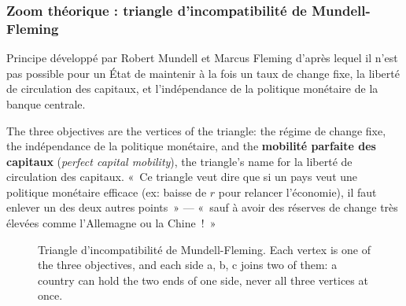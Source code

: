 \subsubsection{Zoom théorique : triangle d'incompatibilité de Mundell-Fleming}

\begin{definition}
  Principe développé par Robert Mundell et Marcus Fleming d'après lequel il n'est pas
  possible pour un État de maintenir à la fois un taux de change fixe, la liberté de
  circulation des capitaux, et l'indépendance de la politique monétaire de la banque
  centrale.
\end{definition}

The three objectives are the vertices of the triangle: the régime de change fixe, the
indépendance de la politique monétaire, and the \textbf{mobilité parfaite des capitaux}
(\textit{perfect capital mobility}), the triangle's name for la liberté de circulation
des capitaux. «~Ce triangle veut dire que si un pays veut une politique monétaire
efficace (ex: baisse de $r$ pour relancer l'économie), il faut enlever un des deux
autres points~» --- «~sauf à avoir des réserves de change très élevées comme
l'Allemagne ou la Chine~!~»

\begin{figure}[h!]
  \centering
  \caption*{\small Triangle d'incompatibilité de Mundell-Fleming. Each vertex is one of
    the three objectives, and each side a, b, c joins two of them: a country can hold
    the two ends of one side, never all three vertices at once.}
\end{figure}

